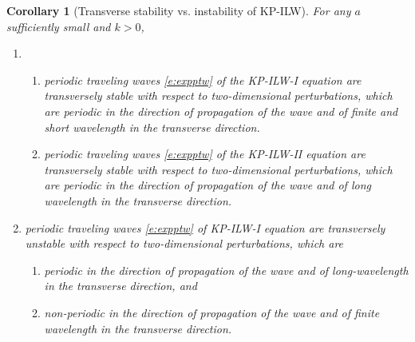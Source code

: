 \documentclass[12pt]{amsart}    %
\newtheorem{corollary}[theorem]{Corollary}
\numberwithin{equation}{section}
\begin{document}
\begin{corollary}[Transverse stability vs. instability of KP-ILW]\label{c:ilw}
For any $a$ sufficiently small and $k>0$, 
\begin{enumerate}
\item 
\begin{enumerate}
    \item periodic traveling waves \eqref{e:expptw} of the KP-ILW-I equation are transversely stable with respect to two-dimensional perturbations, which are periodic in the direction of propagation of the wave and of finite and short wavelength in the transverse direction.
    \item periodic traveling waves \eqref{e:expptw} of the KP-ILW-II equation are transversely stable with respect to two-dimensional perturbations, which are periodic in the direction of propagation of the wave and of long wavelength in the transverse direction. 
\end{enumerate}
\item  periodic traveling waves \eqref{e:expptw} of KP-ILW-I equation are transversely unstable with respect to two-dimensional perturbations, which are 
    \begin{enumerate}
        \item periodic in the direction of propagation of the wave and of long-wavelength in the transverse direction, and
        \item non-periodic in the direction of propagation of the wave and of finite wavelength in the transverse direction.
    \end{enumerate}
\end{enumerate}
\end{corollary}
\end{document}
